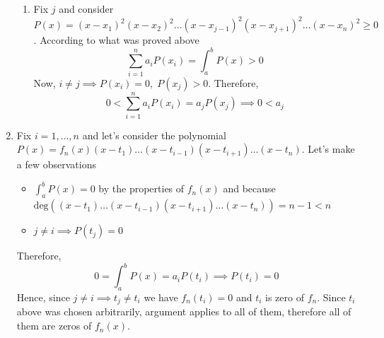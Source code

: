 \documentclass[8pt]{article} %
\begin{document}
\begin{enumerate}[label=\bfseries\arabic*.]
{\begin{enumerate}[label=(\arabic*)]
{	Also, since $\text{deg}(r(x)) \leq n-1$ we may apply Lagrange polynomials and write $r(x)=\sum_{i=1}^n r(x_i)q_i(x)=\sum_{i=1}^n P(x_i)
	q_i(x)\implies \sum_{i=1}^n a_i P(x_i)=\int_a^b r(x)dx=\int_a^b P(x)dx-\int_a^b q(x)f_n(x)dx=\int_a^bP(x)dx$. Clearly,
	$\int_a^b q(x)f_n(x)dx=0$ because of degree of $q(x)$ and properties of $f_n(x)$.}
	\item{Fix $j$ and consider $P(x)=(x-x_1)^2(x-x_2)^2\dots(x-x_{j-1})^2(x-x_{j+1})^2\dots(x-x_n)^2\geq 0$. According to what was proved above
	\[\sum_{i=1}^n a_iP(x_i)=\int_a^b P(x)>0\]Now, $i\neq j\implies P(x_i)=0,\;P(x_j)>0$. Therefore, \[0<\sum_{i=1}^n a_iP(x_i)=a_jP(x_j)
	\implies 0<a_j\]
	}
	\end{enumerate}
}
\item{Fix $i=1,\dots,n$ and let's consider the polynomial $P(x)=f_n(x)(x-t_1)\dots(x-t_{i-1})(x-t_{i+1})\dots(x-t_n)$. Let's make a few
observations
\begin{itemize}
\item{$\int_a^b P(x)=0$ by the properties of $f_n(x)$ and because $\text{deg}((x-t_1)\dots(x-t_{i-1})(x-t_{i+1})\dots(x-t_n))=n-1<n$}
\item{$j\neq i\implies P(t_j)=0$}
\end{itemize}
Therefore, \[0=\int_a^b P(x)=a_i P(t_i)\implies P(t_i)=0\] Hence, since $j\neq i\implies t_j\neq t_i$ we have $f_n(t_i)=0$ and $t_i$ is zero of
$f_n$. Since $t_i$ above was chosen arbitrarily, argument applies to all of them, therefore all of them are zeros of $f_n(x)$.
}
\end{enumerate}
\end{document}
